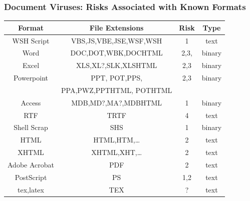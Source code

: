 \documentclass{beamer}
\begin{document}



\begin{frame}
\frametitle{Document Viruses: Risks Associated with Known Formats}
\begin{center}
\begin{small}
\begin{tabular}{|c|c|c|c|}
\hline
Format & File Extensions & Risk & Type \\
\hline
\hline
WSH Script & VBS,JS,VBE,JSE,WSF,WSH & 1 & text \\
\hline
Word & DOC,DOT,WBK,DOCHTML & 2,3, & binary \\
\hline
Excel & XLS,XL?,SLK,XLSHTML & 2,3 & binary \\
\hline
Powerpoint & PPT, POT,PPS, & 2,3 & binary \\
 & PPA,PWZ,PPTHTML, POTHTML & & \\
\hline
Access & MDB,MD?,MA?,MDBHTML & 1 &binary \\
\hline
RTF & TRTF & 4 & text \\
\hline
Shell Scrap & SHS & 1 & binary \\
\hline
HTML & HTML,HTM,\ldots & 2 & text\\
\hline
XHTML & XHTML,XHT,\ldots & 2 & text\\
\hline
Adobe Acrobat & PDF & 2 & text \\
\hline
PostScript & PS & 1,2 & text \\
\hline
tex,latex & TEX & ? & text \\
\hline
\end{tabular}
\end{small}
\end{center}
\end{frame}
\end{document}

